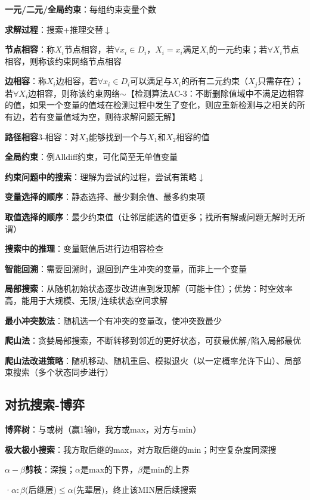 	\textbf{一元/二元/全局约束}：每组约束变量个数
	
	\textbf{求解过程}：搜索+推理交替$\downarrow$
	
	\textbf{节点相容}：称$X_i$节点相容，若$\forall x_i \in D_i$，$X_i=x_i$满足$X_i$的一元约束；若$\forall X_i$节点相容，则称该约束网络节点相容
	
	\textbf{边相容}：称$X_i$边相容，若$\forall x_i \in D_i$可以满足与$X_i$的所有二元约束（$X_j$只需存在）；若$\forall X_i$边相容，则称该约束网络$\sim$【检测算法AC-3：不断删除值域中不满足边相容的值，如果一个变量的值域在检测过程中发生了变化，则应重新检测与之相关的所有边，若有变量值域为空，则待求解问题无解】
	
	\textbf{路径相容}3-相容：对$X_3$能够找到一个与$X_1$和$X_2$相容的值
	
	\textbf{全局约束}：例Alldiff约束，可化简至无单值变量
	
	\textbf{约束问题中的搜索}：理解为尝试的过程，尝试有策略$\downarrow$
	
	\textbf{变量选择的顺序}：静态选择、最少剩余值、最多约束项
	
	\textbf{取值选择的顺序}：最少约束值（让邻居能选的值更多；找所有解或问题无解时无所谓）
	
	\textbf{搜索中的推理}：变量赋值后进行边相容检查
	
	\textbf{智能回溯}：需要回溯时，退回到产生冲突的变量，而非上一个变量
	
	\textbf{局部搜索}：从随机初始状态逐步改进直到发现解（可能卡住）；优势：时空效率高，能用于大规模、无限/连续状态空间求解
	
	\textbf{最小冲突数法}：随机选一个有冲突的变量改，使冲突数最少
	
	\textbf{爬山法}：贪婪局部搜索，不断转移到邻近的更好状态，可获最优解/陷入局部最优
	
	\textbf{爬山法改进策略}：随机移动、随机重启、模拟退火（以一定概率允许下山）、局部束搜索（多个状态同步进行）
	
	\subsection*{对抗搜索-博弈}
	
	\textbf{博弈树}：与或树（赢1输0，我方或max，对方与min）
	
	\textbf{极大极小搜索}：我方取后继的max，对方取后继的min；时空复杂度同深搜
	
	\textbf{$\alpha-\beta$剪枝}：深搜；$\alpha$是max的下界，$\beta$是min的上界
	
	·$\alpha : \beta \text{(后继层)} \leq \alpha \text{(先辈层)，}\text{终止该} \mathrm{MIN} \text{层后续搜索}$
	

